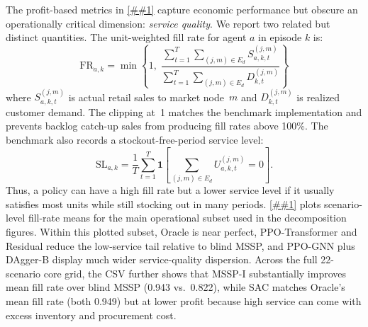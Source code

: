 \documentclass[10pt,a4paper]{article}
\providecommand{\Cref}[1]{\ref{##1}}
\begin{document}
The profit-based metrics in \Cref{sec:results} capture economic
performance but obscure an operationally critical dimension:
\emph{service quality}. We report two related but distinct quantities.
The unit-weighted fill rate for agent $a$ in episode $k$ is:
\begin{equation}
  \text{FR}_{a,k}
  =
  \min\left\{1,\;
  \frac{\sum_{t=1}^{T}\sum_{(j,m)\in E_d} S_{a,k,t}^{(j,m)}}
       {\sum_{t=1}^{T}\sum_{(j,m)\in E_d} D_{k,t}^{(j,m)}}\right\}
\end{equation}
where $S_{a,k,t}^{(j,m)}$ is actual retail sales to market node~$m$
and $D_{k,t}^{(j,m)}$ is realized customer demand. The clipping at~1
matches the benchmark implementation and prevents backlog catch-up sales
from producing fill rates above 100\%. The benchmark also records a
stockout-free-period service level:
\begin{equation}
  \text{SL}_{a,k}
  =
  \frac{1}{T}\sum_{t=1}^{T}
  \mathbf{1}\!\left[
    \sum_{(j,m)\in E_d} U_{a,k,t}^{(j,m)} = 0
  \right].
\end{equation}
Thus, a policy can have a high fill rate but a lower service level if it
usually satisfies most units while still stocking out in many periods.
\Cref{fig:fill_rate_dist} plots scenario-level fill-rate means for the
main operational subset used in the decomposition figures. Within this
plotted subset, Oracle is near perfect, PPO-Transformer and Residual
reduce the low-service tail relative to blind MSSP, and PPO-GNN plus
DAgger-B display much wider service-quality dispersion. Across the full
22-scenario core grid, the CSV further shows that MSSP-I substantially
improves mean fill rate over blind MSSP (0.943 vs.\ 0.822), while SAC
matches Oracle's mean fill rate (both 0.949) but at lower profit because
high service can come with excess inventory and procurement cost.
\end{document}
